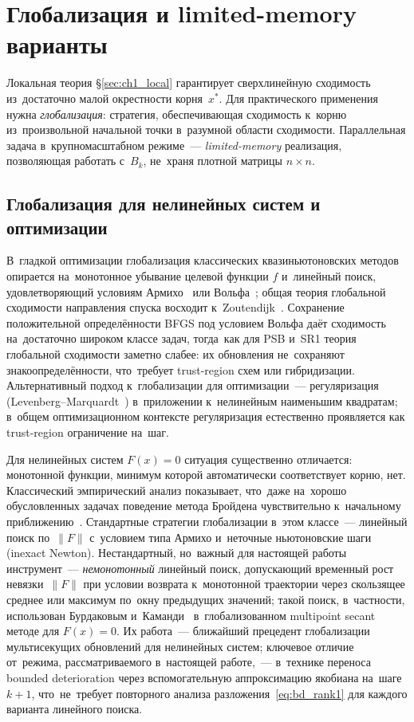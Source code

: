\section{Глобализация и limited-memory варианты}\label{sec:ch1_global}

Локальная теория \S\ref{sec:ch1_local} гарантирует сверхлинейную
сходимость из~достаточно малой окрестности корня~$x^*$. Для практического применения нужна
\emph{глобализация}: стратегия, обеспечивающая сходимость к~корню
из~произвольной начальной точки в~разумной области сходимости. Параллельная
задача в~крупномасштабном режиме~--- \emph{limited-memory} реализация,
позволяющая работать с~$B_k$, не~храня плотной матрицы $n\times n$.

\subsection{Глобализация для нелинейных систем и оптимизации}

В~гладкой оптимизации глобализация классических квазиньютоновских
методов опирается на~монотонное убывание целевой функции $f$ и~линейный
поиск, удовлетворяющий условиям Армихо~\cite{armijo1966} или
Вольфа~\cite{wolfe1969}; общая теория глобальной сходимости
направления спуска восходит к~Zoutendijk~\cite{zoutendijk1970}.
Сохранение положительной определённости BFGS под условием Вольфа даёт
сходимость на~достаточно широком классе задач, тогда~как
для PSB и~SR1 теория глобальной сходимости заметно слабее: их обновления
не~сохраняют знакоопределённости, что~требует trust-region схем
или гибридизации. Альтернативный подход к~глобализации для
оптимизации~--- регуляризация (Levenberg--Marquardt~\cite{marquardt1963})
в~приложении к~нелинейным наименьшим квадратам; в~общем оптимизационном
контексте регуляризация естественно проявляется как trust-region
ограничение на~шаг.

Для нелинейных систем $F(x)=0$ ситуация существенно отличается:
монотонной функции, минимум которой автоматически соответствует
корню, нет. Классический эмпирический
анализ показывает, что~даже на~хорошо обусловленных задачах
поведение метода Бройдена чувствительно к~начальному
приближению~\cite{shannophua1978,more1981}. Стандартные стратегии
глобализации в~этом классе~--- линейный поиск по~$\|F\|$ с~условием
типа Армихо и~неточные ньютоновские шаги (inexact Newton).
Нестандартный, но~важный для настоящей работы инструмент~---
\emph{немонотонный} линейный поиск, допускающий временный рост
невязки~$\|F\|$ при условии возврата к~монотонной траектории через
скользящее среднее или максимум по~окну предыдущих значений; такой
поиск, в~частности, использован Бурдаковым и~Каманди~\cite{burdakov2018}
в~глобализованном multipoint secant методе для $F(x)=0$. Их работа~---
ближайший прецедент глобализации мультисекущих обновлений для
нелинейных систем; ключевое отличие от~режима, рассматриваемого
в~настоящей работе,~--- в~технике переноса bounded deterioration
через вспомогательную аппроксимацию якобиана на~шаге $k+1$,
что~не~требует повторного анализа разложения~\eqref{eq:bd_rank1}
для каждого варианта линейного поиска.

